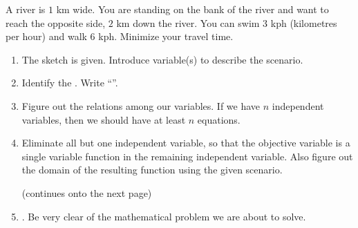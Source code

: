 \documentclass[../main.tex]{subfiles}
\begin{document}
  \begin{example} \label{ex:optimization-swim}
    A  river is \(1\) km wide. You are standing on the bank of the river and want to reach the opposite side, \(2\) km down the river. You can swim \(3\) kph (kilometres per hour) and walk \(6\) kph. Minimize your travel time.

    \hfill{}

    \begin{enumerate}
      \item The sketch is given. Introduce variable(s) to describe the scenario.

      \item Identify the . Write ``''. 

      \item Figure out the relations among our variables. If we have \(n\) independent variables, then we should have at least \(n\) equations.

      \item Eliminate all but one independent variable, so that the objective variable is a single variable function in the remaining independent variable. Also figure out the domain of the resulting function using the given scenario.

        \vfill{}{\footnotesize (continues onto the next page)} \clearpage

      \item {}. Be very clear of the mathematical problem we are about to solve.
    \end{enumerate}
  \end{example}
\end{document}
